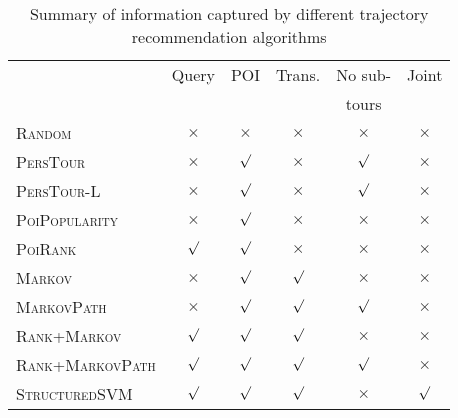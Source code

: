 

\begin{table}[t]
\caption{Summary of information captured by different trajectory recommendation algorithms}
\label{tab:algsummary}
\centering
\setlength{\tabcolsep}{3pt} %
\begin{tabular}{l|*{5}{c}} \hline
                                & Query    & POI      & Trans.     & No sub-      & Joint    \\
                                &          &          &            & tours        &          \\ \hline
\textsc{Random}                 & $\times$ & $\times$ & $\times$   & $\times$     & $\times$ \\
\textsc{PersTour}\cite{ijcai15} & $\times$ & $\surd$  & $\times$   & $\surd$      & $\times$ \\
\textsc{PersTour-L}             & $\times$ & $\surd$  & $\times$   & $\surd$      & $\times$ \\
\textsc{PoiPopularity}          & $\times$ & $\surd$  & $\times$   & $\times$     & $\times$ \\
\textsc{PoiRank}                & $\surd$  & $\surd$  & $\times$   & $\times$     & $\times$ \\
\textsc{Markov}                 & $\times$ & $\surd$  & $\surd$    & $\times$     & $\times$ \\
\textsc{MarkovPath}             & $\times$ & $\surd$  & $\surd$    & $\surd$      & $\times$ \\
\textsc{Rank+Markov}            & $\surd$  & $\surd$  & $\surd$    & $\times$     & $\times$ \\
\textsc{Rank+MarkovPath}        & $\surd$  & $\surd$  & $\surd$    & $\surd$      & $\times$ \\
\textsc{StructuredSVM}          & $\surd$  & $\surd$  & $\surd$    & $\times$     & $\surd$  \\ \hline
\end{tabular}
\end{table}

